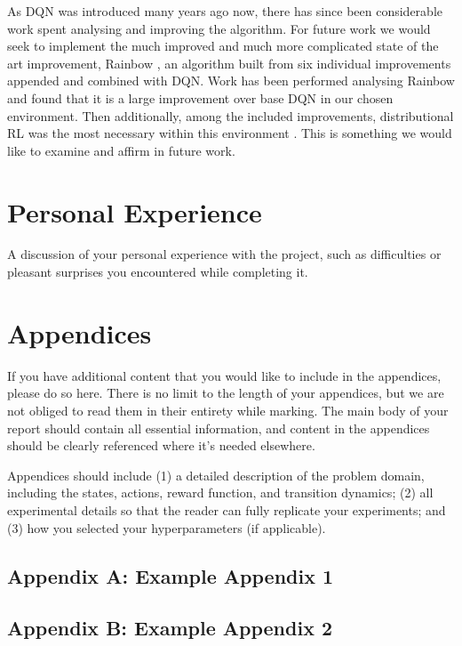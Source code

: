 \documentclass{article}
\begin{document}
As DQN was introduced many years ago now, there has since been considerable work spent analysing and improving the algorithm. For future work we would seek to implement the much improved and much more complicated state of the art improvement, Rainbow \citep{rainbow}, an algorithm built from six individual improvements appended and combined with DQN. Work has been performed analysing Rainbow and found that it is a large improvement over base DQN in our chosen environment. Then additionally, among the included improvements, distributional RL \citep{distributionalrl} was the most necessary within this environment \cite{revisitingrainbow}. This is something we would like to examine and affirm in future work. 

\section{Personal Experience}
A discussion of your personal experience with the project, such as
difficulties or pleasant surprises you encountered while completing it.




\newpage
\section*{Appendices}
If you have additional content that you would like to include in the appendices, please do so here.
There is no limit to the length of your appendices, but we are not obliged to read them in their entirety while marking. The main body of your report should contain all essential information, and content in the appendices should be clearly referenced where it's needed elsewhere.



Appendices should include (1) a detailed description of the problem domain,
including the states, actions, reward function, and transition dynamics; (2) all experimental
details so that the reader can fully replicate your experiments; and (3) how you selected your
hyperparameters (if applicable).
\subsection*{Appendix A: Example Appendix 1}
\subsection*{Appendix B: Example Appendix 2}
\end{document}
